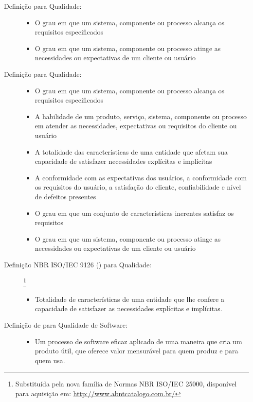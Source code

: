 \documentclass[
	12pt,				%
	openright,			%
	oneside,			%
	a4paper,			%
	english,			%
	brazil,				%
	]{abntex2}
\begin{document}
\begin{description}
    \item[Definição  para Qualidade:] \hfill
        \begin{itemize}
            \item O grau em que um sistema, componente ou processo alcança os requisitos especificados
            \item O grau em que um sistema, componente ou processo atinge as necessidades ou expectativas de um cliente ou usuário
        \end{itemize}
    \item[Definição  para Qualidade:] \hfill
        \begin{itemize}
            \item O grau em que um sistema, componente ou processo alcança os requisitos especificados
            \item A habilidade de um produto, serviço, sistema, componente ou processo em atender as necessidades, expectativas ou requisitos do cliente ou usuário
            \item A totalidade das características de uma entidade que afetam sua capacidade de satisfazer necessidades explícitas e implícitas
            \item A conformidade com as expectativas dos usuários, a conformidade com os requisitos do usuário, a satisfação do cliente, confiabilidade e nível de defeitos presentes
            \item O grau em que um conjunto de características inerentes satisfaz os requisitos
            \item O grau em que um sistema, componente ou processo atinge as necessidades ou expectativas de um cliente ou usuário
        \end{itemize}
    \item[Definição NBR ISO/IEC 9126 (\citeyear{nbr9126}) para Qualidade:]\footnote{Substituída pela nova família de Normas NBR ISO/IEC 25000, disponível para aquisição em: \url{http://www.abntcatalogo.com.br/}}
        \begin{itemize}
            \item  Totalidade de características de uma entidade que lhe confere a capacidade de satisfazer as necessidades explícitas e implícitas.
        \end{itemize}
    \item[Definição de  para Qualidade de Software:] \hfill %
        \begin{itemize}
            \item Um processo de software eficaz aplicado de uma maneira que cria um produto útil, que oferece valor mensurável para quem produz e para quem usa.
        \end{itemize}
\end{description}
\end{document}
